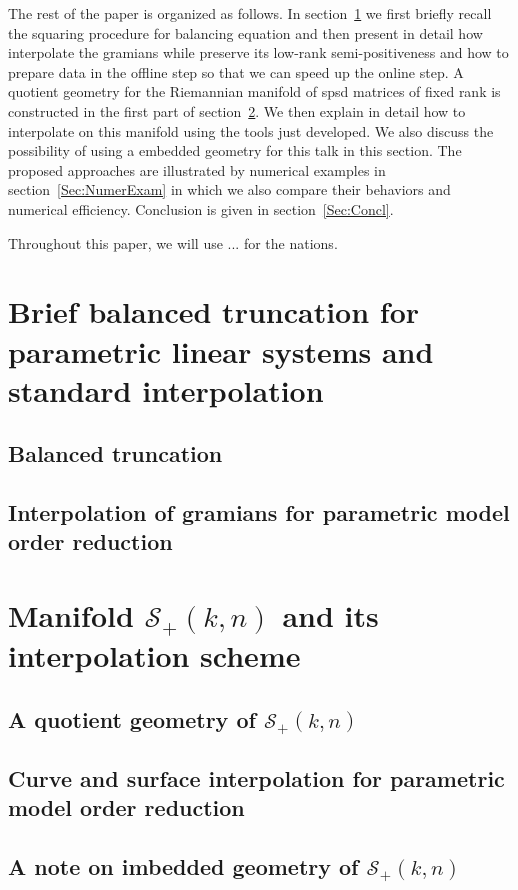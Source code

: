 The rest of the paper is organized as follows. In section~\ref{Sec:BT_standard interpolation} we first briefly recall the squaring procedure for balancing equation and then present in detail how interpolate the gramians while preserve its low-rank semi-positiveness and how to prepare data in the offline step so that we can speed up the online step. A quotient geometry for the Riemannian manifold of spsd matrices of fixed rank is constructed in the first part of section~\ref{Sec:Manifold}. We then explain in detail how to interpolate on this manifold using the tools just developed. We also discuss the possibility of using a embedded geometry  for this talk in this section. The proposed approaches are illustrated by numerical examples in section~\ref{Sec:NumerExam} in which we also compare their behaviors and numerical efficiency. Conclusion is given in section~\ref{Sec:Concl}. 

Throughout this paper, we will use ... for the nations.





\section{Brief balanced truncation for parametric linear systems and standard interpolation}\label{Sec:BT_standard interpolation}
\subsection{Balanced truncation}
\subsection{Interpolation of gramians for parametric model order reduction}

\section{Manifold $\mathcal{S}_+(k,n)$ and its interpolation scheme}\label{Sec:Manifold}
\subsection{A quotient geometry of $\mathcal{S}_+(k,n)$}
\subsection{Curve and surface interpolation for parametric model order reduction}
\subsection{A note on imbedded geometry of $\mathcal{S}_+(k,n)$}

